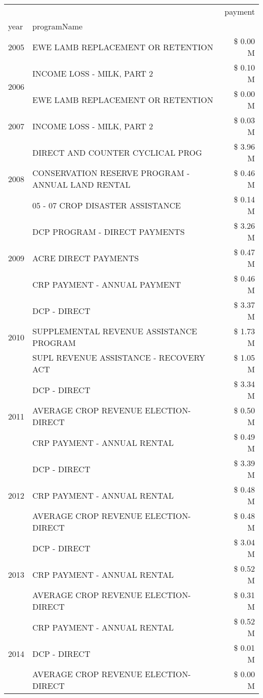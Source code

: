 \begin{tabular}{llr}
\toprule
 &  & payment \\
year & programName &  \\
\midrule
2005 & EWE LAMB REPLACEMENT OR RETENTION & \$ 0.00 M \\
\cline{1-3}
\multirow[t]{2}{*}{2006} & INCOME LOSS - MILK, PART 2 & \$ 0.10 M \\
 & EWE LAMB REPLACEMENT OR RETENTION & \$ 0.00 M \\
\cline{1-3}
2007 & INCOME LOSS - MILK, PART 2 & \$ 0.03 M \\
\cline{1-3}
\multirow[t]{3}{*}{2008} & DIRECT AND COUNTER CYCLICAL PROG & \$ 3.96 M \\
 & CONSERVATION RESERVE PROGRAM - ANNUAL LAND RENTAL & \$ 0.46 M \\
 & 05 - 07 CROP DISASTER ASSISTANCE & \$ 0.14 M \\
\cline{1-3}
\multirow[t]{3}{*}{2009} & DCP PROGRAM - DIRECT PAYMENTS & \$ 3.26 M \\
 & ACRE DIRECT PAYMENTS & \$ 0.47 M \\
 & CRP PAYMENT - ANNUAL PAYMENT & \$ 0.46 M \\
\cline{1-3}
\multirow[t]{3}{*}{2010} & DCP - DIRECT & \$ 3.37 M \\
 & SUPPLEMENTAL REVENUE ASSISTANCE PROGRAM & \$ 1.73 M \\
 & SUPL REVENUE ASSISTANCE - RECOVERY ACT & \$ 1.05 M \\
\cline{1-3}
\multirow[t]{3}{*}{2011} & DCP - DIRECT & \$ 3.34 M \\
 & AVERAGE CROP REVENUE ELECTION-DIRECT & \$ 0.50 M \\
 & CRP PAYMENT - ANNUAL RENTAL & \$ 0.49 M \\
\cline{1-3}
\multirow[t]{3}{*}{2012} & DCP - DIRECT & \$ 3.39 M \\
 & CRP PAYMENT - ANNUAL RENTAL & \$ 0.48 M \\
 & AVERAGE CROP REVENUE ELECTION-DIRECT & \$ 0.48 M \\
\cline{1-3}
\multirow[t]{3}{*}{2013} & DCP - DIRECT & \$ 3.04 M \\
 & CRP PAYMENT - ANNUAL RENTAL & \$ 0.52 M \\
 & AVERAGE CROP REVENUE ELECTION-DIRECT & \$ 0.31 M \\
\cline{1-3}
\multirow[t]{3}{*}{2014} & CRP PAYMENT - ANNUAL RENTAL & \$ 0.52 M \\
 & DCP - DIRECT & \$ 0.01 M \\
 & AVERAGE CROP REVENUE ELECTION-DIRECT & \$ 0.00 M \\

\end{tabular}
